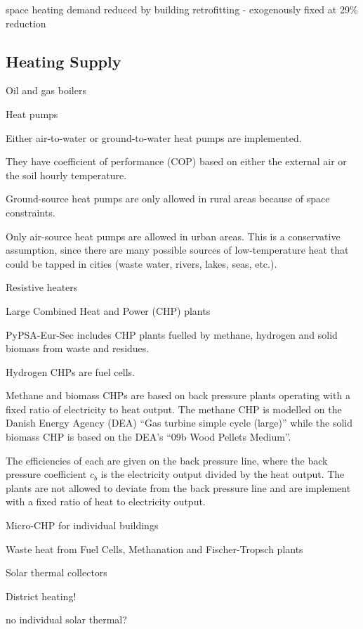 space heating demand reduced by building retrofitting
- exogenously fixed at 29\% reduction

\subsection{Heating Supply}

Oil and gas boilers

Heat pumps

Either air-to-water or ground-to-water heat pumps are implemented.

They have coefficient of performance (COP) based on either the external air or the soil hourly temperature.

Ground-source heat pumps are only allowed in rural areas because of space constraints.

Only air-source heat pumps are allowed in urban areas. This is a conservative
assumption, since there are many possible sources of low-temperature heat that
could be tapped in cities (waste water, rivers, lakes, seas, etc.).

Resistive heaters

Large Combined Heat and Power (CHP) plants


PyPSA-Eur-Sec includes CHP plants fuelled by methane, hydrogen and solid biomass from waste and residues.

Hydrogen CHPs are fuel cells.

Methane and biomass CHPs are based on back pressure plants operating with a
fixed ratio of electricity to heat output. The methane CHP is modelled on the
Danish Energy Agency (DEA) “Gas turbine simple cycle (large)” while the solid
biomass CHP is based on the DEA’s “09b Wood Pellets Medium”.

The efficiencies of each are given on the back pressure line, where the back
pressure coefficient $c_b$ is the electricity output divided by the heat output.
The plants are not allowed to deviate from the back pressure line and are
implement with a fixed ratio of heat to electricity output.

Micro-CHP for individual buildings

Waste heat from Fuel Cells, Methanation and Fischer-Tropsch plants

Solar thermal collectors

District heating!

no individual solar thermal?

